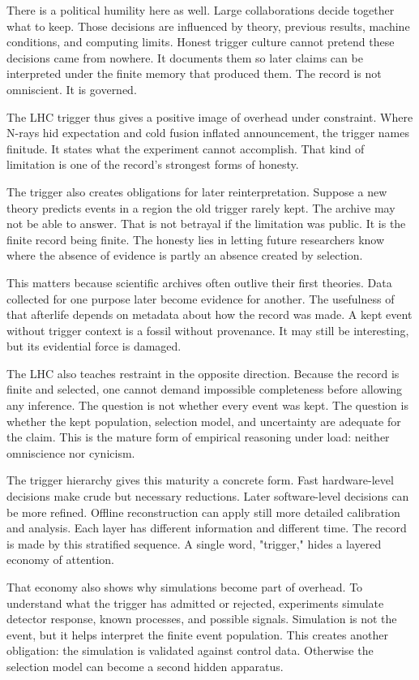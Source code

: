 There is a political humility here as well. Large collaborations decide
together what to keep. Those decisions are influenced by theory,
previous results, machine conditions, and computing limits. Honest
trigger culture cannot pretend these decisions came from nowhere. It documents them so later
claims can be interpreted under the finite memory that produced them. The
record is not omniscient. It is governed.

The LHC trigger thus gives a positive image of overhead under constraint.
Where N-rays hid expectation and cold fusion inflated announcement, the
trigger names finitude. It states what the experiment cannot accomplish.
That kind of limitation is one of the record's strongest forms of
honesty.

The trigger also creates obligations for later reinterpretation. Suppose a new
theory predicts events in a region the old trigger rarely kept. The archive
may not be able to answer. That is not betrayal if the limitation was public.
It is the finite record being finite. The honesty lies in letting future
researchers know where the absence of evidence is partly an absence created by
selection.

This matters because scientific archives often outlive their first theories.
Data collected for one purpose later become evidence for another. The
usefulness of that afterlife depends on metadata about how the record was
made. A kept event without trigger context is a fossil without provenance. It
may still be interesting, but its evidential force is damaged.

The LHC also teaches restraint in the opposite direction. Because the record
is finite and selected, one cannot demand impossible completeness before
allowing any inference. The question is not whether every event was kept. The
question is whether the kept population, selection model, and uncertainty are
adequate for the claim. This is the mature form of empirical reasoning under
load: neither omniscience nor cynicism.

The trigger hierarchy gives this maturity a concrete form. Fast hardware-level
decisions make crude but necessary reductions. Later software-level decisions
can be more refined. Offline reconstruction can apply still more detailed
calibration and analysis. Each layer has different information and different
time. The record is made by this stratified sequence. A single word,
"trigger," hides a layered economy of attention.

That economy also shows why simulations become part of overhead. To
understand what the trigger has admitted or rejected, experiments
simulate detector response, known processes, and possible signals.
Simulation is not the event, but it helps interpret the finite event
population. This creates another obligation: the simulation is validated
against control data. Otherwise the selection model can become a second
hidden apparatus.

